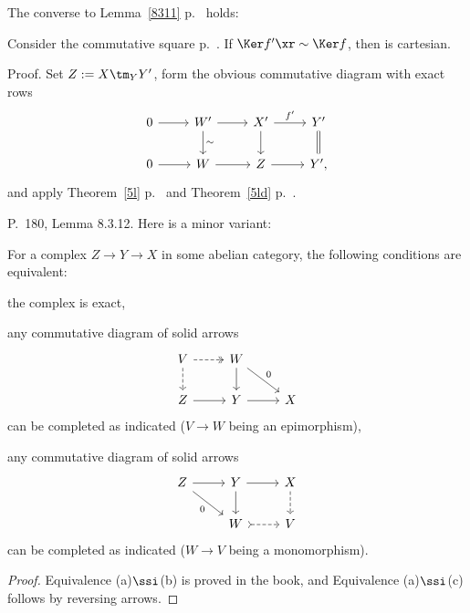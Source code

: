 \documentclass[12pt]{article}
\theoremstyle{remark}
\theoremstyle{definition}
\begin{document}
\begin{s} 
The converse to Lemma~\ref{8311} p.~ holds:

Consider the commutative square  p.~. If $\Ker f'\xr\sim\Ker f$, then  is cartesian. 

Proof. Set $Z:=X\tm_YY'$, form the obvious commutative diagram with exact rows
$$
\begin{tikzcd}
0\ar[r]&W'\ar[d,"\sim"]\ar[r]&X'\ar[d]\ar[r,"f'"]&Y'\ar[d,equal]\\ 
0\ar[r]&W\ar[r]&Z\ar[r]&Y',
\end{tikzcd} 
$$ 
and apply Theorem~\ref{5l} p.~ and Theorem~\ref{5ld} p.~.
\end{s}

%

\begin{s}
P.~180, Lemma 8.3.12. Here is a minor variant:

\begin{lem}
For a complex $Z\to Y\to X$ in some abelian category, the following conditions are equivalent:

 the complex is exact,

 any commutative diagram of solid arrows
$$
\begin{tikzcd}
V\ar[dashed]{d}\ar[dashed, two heads]{r}&W\ar{dr}{0}\ar{d}\\ 
Z\ar{r}&Y\ar{r}&X
\end{tikzcd}
$$ 
can be completed as indicated ($V\to W$ being an epimorphism),

 any commutative diagram of solid arrows
$$
\begin{tikzcd}
Z\ar{dr}[swap]{0}\ar{r}&Y\ar{d}\ar{r}&X\ar[dashed]{d}\\ 
{}&W\ar[tail,dashed]{r}&V
\end{tikzcd}
$$ 
can be completed as indicated ($W\to V$ being a monomorphism).
\end{lem}

\begin{proof}
Equivalence (a)$\ssi$(b) is proved in the book, and Equivalence (a)$\ssi$(c) follows by reversing arrows.
\end{proof}
\end{s}

%
\end{document}
